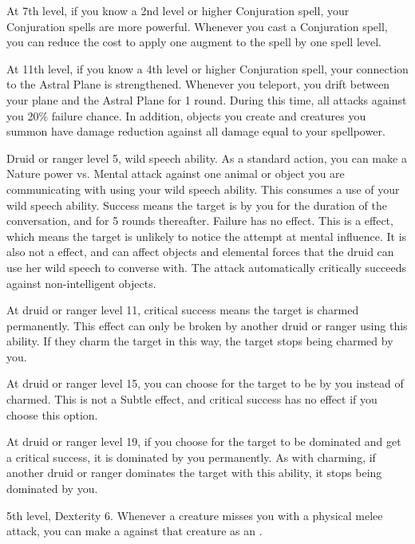     At 7th level, if you know a 2nd level or higher Conjuration spell, your Conjuration spells are more powerful.
    Whenever you cast a Conjuration spell, you can reduce the cost to apply one augment to the spell by one spell level.

    At 11th level, if you know a 4th level or higher Conjuration spell, your connection to the Astral Plane is strengthened.
    Whenever you teleport, you drift between your plane and the Astral Plane for 1 round.
    During this time, all attacks against you 20\% failure chance.
    In addition, objects you create and creatures you summon have damage reduction against all damage equal to your spellpower.

    \featpres Druid or ranger level 5, wild speech ability.
    \featben  As a standard action, you can make a Nature power vs. Mental attack against one animal or object you are communicating with using your wild speech ability.
    This consumes a use of your wild speech ability.
    Success means the target is \charmed by you for the duration of the conversation, and for 5 rounds thereafter.
    Failure has no effect.
    This is a  effect, which means the target is unlikely to notice the attempt at mental influence.
    It is also not a  effect, and can affect objects and elemental forces that the druid can use her wild speech to converse with.
    The attack automatically critically succeeds against non-intelligent objects.

    At druid or ranger level 11, critical success means the target is charmed permanently.
    This effect can only be broken by another druid or ranger using this ability.
    If they charm the target in this way, the target stops being charmed by you.

    At druid or ranger level 15, you can choose for the target to be \dominated by you instead of charmed.
    This is not a Subtle effect, and critical success has no effect if you choose this option.

    At druid or ranger level 19, if you choose for the target to be dominated and get a critical success, it is dominated by you permanently.
    As with charming, if another druid or ranger dominates the target with this ability, it stops being dominated by you.

    \featpres 5th level, Dexterity 6.
    \featben Whenever a creature misses you with a physical melee attack, you can make a  against that creature as an .

